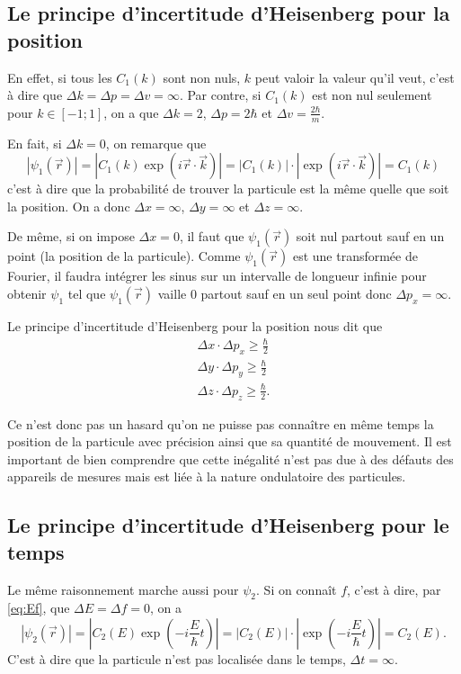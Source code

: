 \subsection{Le principe d'incertitude d'Heisenberg pour la position}
En effet, si tous les $C_1(k)$ sont non nuls,
$k$ peut valoir la valeur qu'il veut,
c'est à dire que
$\Delta k = \Delta p = \Delta v = \infty$.
Par contre, si $C_1(k)$ est non nul seulement
pour $k \in [-1;1]$, on a que
$\Delta k = 2$, $\Delta p = 2\hbar$ et $\Delta v = \frac{2\hbar}{m}$.

En fait, si $\Delta k = 0$, on remarque que
\[ |\psi_1(\vec{r})|
= \left|C_1(k) \exp\left(i\vec{r} \cdot \vec{k}\right)\right|
= \left|C_1(k)\right|\cdot\left|\exp\left(i\vec{r} \cdot \vec{k}\right)\right|
= C_1(k) \]
c'est à dire que la probabilité de trouver la particule est la même
quelle que soit la position.
On a donc $\Delta x = \infty$, $\Delta y = \infty$ et $\Delta z = \infty$.

De même, si on impose $\Delta x = 0$, il faut que $\psi_1(\vec{r})$ soit nul
partout sauf en un point (la position de la particule). Comme $\psi_1(\vec{r})$ 
est une transformée de Fourier, il faudra intégrer les sinus
sur un intervalle de longueur infinie pour obtenir
$\psi_1$ tel que $\psi_1(\vec{r})$ vaille 0 partout sauf en un seul point
donc $\Delta p_x = \infty$.

Le principe d'incertitude d'Heisenberg pour la position nous dit que
\begin{align*}
  \Delta x \cdot \Delta p_x \geq \frac{\hbar}{2}\\
  \Delta y \cdot \Delta p_y \geq \frac{\hbar}{2}\\
  \Delta z \cdot \Delta p_z \geq \frac{\hbar}{2}.
\end{align*}

Ce n'est donc pas un hasard qu'on ne puisse pas connaître en même temps
la position de la particule avec précision ainsi que sa quantité de mouvement.
Il est important de bien comprendre que cette inégalité n'est pas due
à des défauts des appareils de mesures mais est liée à la nature
ondulatoire des particules.

\subsection{Le principe d'incertitude d'Heisenberg pour le temps}
Le même raisonnement marche aussi pour $\psi_2$.
Si on connaît $f$, c'est à dire, par \eqref{eq:Ef},
que $\Delta E = \Delta f = 0$, on a
\[ |\psi_2(\vec{r})|
= \left|C_2(E) \exp\left(-i\frac{E}{\hbar}t\right)\right|
= \left|C_2(E)\right|\cdot\left|\exp\left(-i\frac{E}{\hbar}t\right)\right|
= C_2(E). \]
C'est à dire que la particule n'est pas localisée dans le temps, $\Delta t = \infty$.

